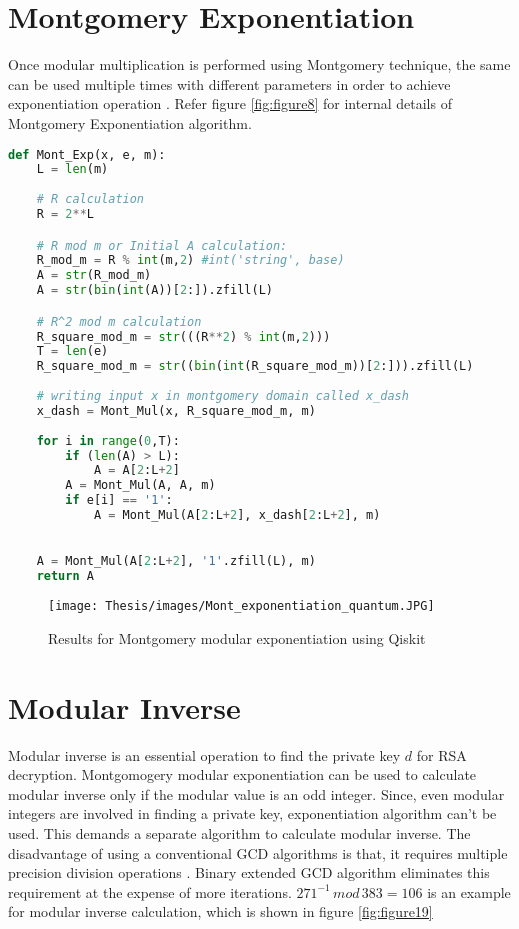 \documentclass{cpp}
\begin{document}
\section{Montgomery Exponentiation}

Once modular multiplication is performed using Montgomery technique, the same can be used multiple times with different parameters in order to achieve exponentiation operation \cite{alfred:paul:scott}. Refer figure \ref{fig:figure8} for internal details of Montgomery Exponentiation algorithm.

\newpage
\begin{lstlisting}[language=Python]
def Mont_Exp(x, e, m):
    L = len(m)
    
    # R calculation
    R = 2**L

    # R mod m or Initial A calculation:
    R_mod_m = R % int(m,2) #int('string', base)
    A = str(R_mod_m)
    A = str(bin(int(A))[2:]).zfill(L) 

    # R^2 mod m calculation
    R_square_mod_m = str(((R**2) % int(m,2)))
    T = len(e)
    R_square_mod_m = str((bin(int(R_square_mod_m))[2:])).zfill(L)
    
    # writing input x in montgomery domain called x_dash
    x_dash = Mont_Mul(x, R_square_mod_m, m)
   
    for i in range(0,T):
        if (len(A) > L):
            A = A[2:L+2]
        A = Mont_Mul(A, A, m)
        if e[i] == '1':
            A = Mont_Mul(A[2:L+2], x_dash[2:L+2], m)
            

    A = Mont_Mul(A[2:L+2], '1'.zfill(L), m)
    return A
\end{lstlisting}

\begin{figure*}[htp]
    \centering
    \texttt{[image: Thesis/images/Mont\_exponentiation\_quantum.JPG]}
    \caption{Results for Montgomery modular exponentiation using Qiskit}
    \label{fig:figure16}
\end{figure*}

\section{Modular Inverse}	

Modular inverse is an essential operation to find the private key $d$ for RSA decryption. Montgomogery modular exponentiation can be used to calculate modular inverse only if the modular value is an odd integer. Since, even modular integers are involved in finding a private key, exponentiation algorithm can't be used. This demands a separate algorithm to calculate modular inverse. The disadvantage of using a conventional GCD algorithms is that, it requires multiple precision division operations \cite{alfred:paul:scott}. Binary extended GCD algorithm eliminates this requirement at the expense of more iterations.
$271^{-1}\,mod\,383 = 106$ is an example for modular inverse calculation, which is shown in figure \ref{fig:figure19}
\end{document}
